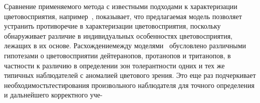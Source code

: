 \begin{multicols}{2}
  Сравнение применяемого метода с известными подходами к характеризации 
цветовосприятия, например~\cite{5ar, 6ar}, показывает, что предлагаемая\linebreak 
модель позволяет устранить противоречие в характеризации 
цветовосприятия, %
поскольку обнаруживает различие в 
индивидуальных особенностях цветовосприятия, лежащих в их основе. 
Расхождение\linebreak между моделями~\cite{5ar, 6ar} обусловлено различными\linebreak 
гипотезами о цветовосприятии дейтеранопов, протанопов и тританопов, в 
частности к различию в определении зон толерантности одних и тех же 
типичных наблюдателей с аномалией цветового
 зрения.
 Это еще раз 
подчеркивает необходимость\linebreak тестирования  произвольного наблюдателя для точного
определения и дальнейшего корректного уче-\linebreak\vspace*{-12pt}

\pagebreak

\end{multicols}

\begin{figure} %
\vspace*{1pt}
\begin{center}
\mbox{%
\epsfxsize=124.669mm
}
\end{center}
\vspace*{-6pt}
\end{figure}

